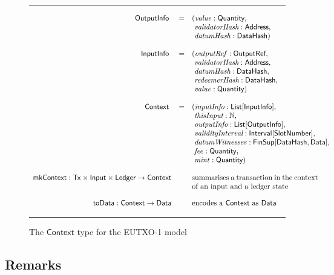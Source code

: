 \documentclass[a4paper]{article}
\renewcommand{\i}{\textit}  %
\newcommand{\s}{\textsf}  %
\newcommand{\msf}[1]{\ensuremath{\mathsf{#1}}}
\newcommand{\mi}[1]{\ensuremath{\mathit{#1}}}
\newcommand\rfskip{7pt}
\newenvironment{ruledfigure}[1]{\begin{figure}[#1]\hrule\vspace{\rfskip}}{\vspace{\rfskip}\hrule\end{figure}}
\newcommand{\List}[1]{\ensuremath{\s{List}[#1]}}
\newcommand{\Interval}[1]{\ensuremath{\s{Interval}[#1]}}
\newcommand{\FinSup}[2]{\ensuremath{\s{FinSup}[#1,#2]}}
\newcommand{\ctx}{\ensuremath{\s{Context}}}
\newcommand{\toData}{\ensuremath{\s{toData}}}
\newcommand{\mkContext}{\ensuremath{\s{mkContext}}}
\newcommand{\Address}{\ensuremath{\s{Address}}}
\newcommand{\DataHash}{\ensuremath{\s{DataHash}}}
\newcommand{\mint}{\mi{mint}}
\newcommand{\fee}{\mi{fee}}
\newcommand{\val}{\mi{value}}  %
\newcommand{\datumHash}{\mi{datumHash}}
\newcommand{\datumWits}{\mi{datumWitnesses}}
\newcommand{\Data}{\ensuremath{\s{Data}}}
\newcommand{\outputref}{\mi{outputRef}}
\newcommand{\slotnum}{\ensuremath{\s{SlotNumber}}}
\newcommand{\eutxotx}{\msf{Tx}}
\newcommand{\qty}{\ensuremath{\s{Quantity}}}
\newcommand\N{\ensuremath{\mathbb{N}}}
\begin{document}
\begin{ruledfigure}{H}
  \begin{displaymath}
  \begin{array}{rll}
    \s{OutputInfo } &=&(\val: \qty,\\
                    & &\ \i{validatorHash}: \Address,\\
                    & &\ \datumHash: \DataHash)\\
    \\
    \s{InputInfo } &=&(\outputref: \s{OutputRef},\\
                   & &\ \i{validatorHash}: \Address,\\
                   & &\ \i{datumHash}: \DataHash,\\
                   & &\ \i{redeemerHash}: \DataHash,\\
                   & &\ \val: \qty)\\
     \\
     \ctx\s{ } &=&(\i{inputInfo}: \List{\s{InputInfo}},\\
               & &\ \i{thisInput}: \N,\\
               & &\ \i{outputInfo}: \List{\s{OutputInfo}},\\
               & &\ \i{validityInterval}: \Interval{\slotnum},\\
               & &\ \datumWits: \FinSup{\DataHash}{\Data},\\
               & &\ \fee: \qty,\\
               & &\ \mint: \qty)\\
     \\
     \mkContext: \eutxotx \times \s{Input} \times \s{Ledger} \rightarrow \ctx
      && \mbox{\parbox[t]{6cm}{summarises a transaction in the context of an input and a ledger state}}\\
      \\
     \toData: \ctx \rightarrow \Data & & \mbox{encodes a \ctx{} as \Data}
  \end{array}
  \end{displaymath}
  \caption{The \ctx{} type for the EUTXO-1 model}
  \label{fig:ptx-1-types}
\end{ruledfigure}

\subsection{Remarks}
\end{document}
